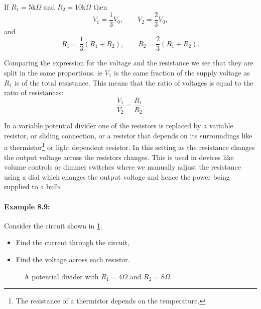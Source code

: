 If $R_{1}=5\text{k}\Omega$ and $R_{2}=10\text{k}\Omega$ then
\begin{equation*}
V_{1}=\frac{1}{3}V_{0}, \qquad V_{2}=\frac{2}{3}V_{0},
\end{equation*}
and 
\begin{equation*}
R_{1}=\frac{1}{3}\left(R_{1}+R_{2}\right), \qquad R_{2}=\frac{2}{3}\left(R_{1}+R_{2}\right).
\end{equation*}

Comparing the expression for the voltage and the resistance we see that they are split in the same proportions. ie $V_{1}$ is the same fraction of the supply voltage as $R_{1}$ is of the total resistance. This means that the ratio of voltages is equal to the ratio of resistances:
\begin{equation}
\frac{V_{1}}{V_{2}}=\frac{R_{1}}{R_{2}}.
\label{eq: voltage ratios}
\end{equation}

In a variable potential divider one of the resistors is replaced by a variable resistor, or sliding connection, or a resistor that depends on its surroundings like a thermistor\footnote{The resistance of a thermistor depends on the temperature.} or  light dependent resistor. In this setting as the resistance changes the output voltage across the resistors changes. This is used in devices like volume controls or dimmer switches where we manually adjust the resistance using a dial which changes the output voltage and hence the power being supplied to a bulb.\\

\paragraph{Example 8.9:} Consider the circuit shown in \cref{fig: pd example}.
\begin{itemize}
\setlength{\itemsep}{-5pt}
    \item[a)] Find the current through the circuit,
    \item[b)] Find the voltage across each resistor.
\end{itemize}  
 \begin{figure}[ht]
    \centering
    \caption{A potential divider with $R_{1}=4\Omega$ and $R_{2}=8\Omega$.}
    \label{fig: pd example}
\end{figure}

